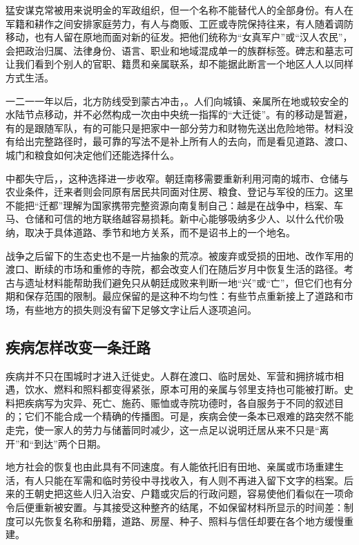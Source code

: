 猛安谋克常被用来说明金的军政组织，但一个名称不能替代人的全部身份。有人在军籍和耕作之间安排家庭劳力，有人与商贩、工匠或寺院保持往来，有人随着调防移动，也有人留在原地而面对新的征发。把他们统称为“女真军户”或“汉人农民”，会把政治归属、法律身份、语言、职业和地域混成单一的族群标签。碑志和墓志可让我们看到个别人的官职、籍贯和亲属联系，却不能据此断言一个地区人人以同样方式生活。

一二一一年以后，北方防线受到蒙古冲击，。人们向城镇、亲属所在地或较安全的水陆节点移动，并不必然构成一次由中央统一指挥的“大迁徙”。有的移动是暂避，有的是跟随军队，有的可能只是把家中一部分劳力和财物先送出危险地带。材料没有给出完整路径时，最可靠的写法不是补上所有人的去向，而是看见道路、渡口、城门和粮食如何决定他们还能选择什么。

中都失守后，，这种选择进一步收窄。朝廷南移需要重新利用河南的城市、仓储与农业条件，迁来者则会同原有居民共同面对住房、粮食、登记与军役的压力。这里不能把“迁都”理解为国家携带完整资源向南复制自己：越是在战争中，档案、车马、仓储和可信的地方联络越容易损耗。新中心能够吸纳多少人、以什么代价吸纳，取决于具体道路、季节和地方关系，而不是诏书上的一个地名。

战争之后留下的生态史也不是一片抽象的荒凉。被废弃或受损的田地、改作军用的渡口、断续的市场和重修的寺院，都会改变人们在随后岁月中恢复生活的路径。考古与遗址材料能帮助我们避免只从朝廷成败来判断一地“兴”或“亡”，但它们也有分期和保存范围的限制。最应保留的是这种不均匀性：有些节点重新接上了道路和市场，有些地方的损失则没有留下足够文字让后人逐项追问。

\subsection{疾病怎样改变一条迁路}

疾病并不只在围城时才进入迁徙史。人群在渡口、临时居处、军营和拥挤城市相遇，饮水、燃料和照料都变得紧张，原本可用的亲属与邻里支持也可能被打断。史料把疾病写为灾异、死亡、施药、赈恤或寺院功德时，各自服务于不同的叙述目的；它们不能合成一个精确的传播图。可是，疾病会使一条本已艰难的路突然不能走完，使一家人的劳力与储蓄同时减少，这一点足以说明迁居从来不只是“离开”和“到达”两个日期。

地方社会的恢复也由此具有不同速度。有人能依托旧有田地、亲属或市场重建生活，有人只能在军需和临时劳役中寻找收入，有人则不再进入留下文字的档案。后来的王朝史把这些人归入治安、户籍或灾后的行政问题，容易使他们看似在一项命令后便重新被安置。与其接受这种整齐的结尾，不如保留材料所显示的时间差：制度可以先恢复名称和册籍，道路、房屋、种子、照料与信任却要在各个地方缓慢重建。
